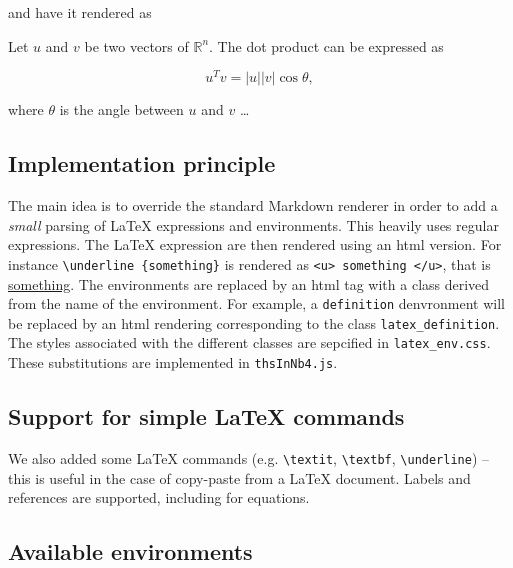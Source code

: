 and have it rendered as

\begin{theorem}
\label{theo:dotp} Let $u$ and $v$ be two vectors of
$\mathbb{R}^n$. The dot product can be expressed as

\begin{equation}
\label{eq:dotp}
u^Tv = |u||v| \cos \theta,
\end{equation}

where $\theta$ is the angle between $u$ and $v$ \ldots{}
\end{theorem}

    \subsection{Implementation principle}\label{implementation-principle}

    The main idea is to override the standard Markdown renderer in order to
add a \emph{small} parsing of LaTeX expressions and environments. This
heavily uses regular expressions. The LaTeX expression are then rendered
using an html version. For instance
\texttt{\textbackslash{}underline\ \{something\}} is rendered as
\texttt{\textless{}u\textgreater{}\ something\ \textless{}/u\textgreater{}},
that is \underline{something}. The environments are replaced by an html
tag with a class derived from the name of the environment. For example,
a \texttt{definition} denvronment will be replaced by an html rendering
corresponding to the class \texttt{latex\_definition}. The styles
associated with the different classes are sepcified in
\texttt{latex\_env.css}. These substitutions are implemented in
\texttt{thsInNb4.js}.

    \subsection{Support for simple LaTeX
commands}\label{support-for-simple-latex-commands}

    We also added some LaTeX commands (e.g. \texttt{\textbackslash{}textit},
\texttt{\textbackslash{}textbf}, \texttt{\textbackslash{}underline}) --
this is useful in the case of copy-paste from a LaTeX document. Labels
and references are supported, including for equations.

    \subsection{Available environments}\label{available-environments}

